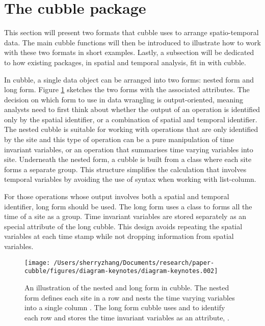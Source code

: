 \documentclass[
]{jss}
\begin{document}
\hypertarget{cubble}{%
\section{The cubble package}\label{cubble}}

This section will present two formats that cubble uses to arrange spatio-temporal data. The main cubble functions will then be introduced to illustrate how to work with these two formats in short examples. Lastly, a subsection will be dedicated to how existing packages, in spatial and temporal analysis, fit in with cubble.

In cubble, a single data object can be arranged into two forms: nested form and long form. Figure \ref{fig:illu-cubble} sketches the two forms with the associated attributes. The decision on which form to use in data wrangling is output-oriented, meaning analysts need to first think about whether the output of an operation is identified only by the spatial identifier, or a combination of spatial and temporal identifier. The nested cubble is suitable for working with operations that are only identified by the site and this type of operation can be a pure manipulation of time invariant variables, or an operation that summarises time varying variables into site. Underneath the nested form, a cubble is built from a  class where each site forms a separate group. This structure simplifies the calculation that involves temporal variables by avoiding the use of  syntax when working with list-column.

For those operations whose output involves both a spatial and temporal identifier, long form should be used. The long form uses a  class to forms all the time of a site as a group. Time invariant variables are stored separately as an special attribute of the long cubble. This design avoids repeating the spatial variables at each time stamp while not dropping information from spatial variables.

\begin{CodeChunk}
\begin{figure}

{\centering \texttt{[image: /Users/sherryzhang/Documents/research/paper-cubble/figures/diagram-keynotes/diagram-keynotes.002]} 

}

\caption{An illustration of the nested and long form in cubble. The nested form defines each site in a row and nests the time varying variables into a single column . The long form cubble uses  and  to identify each row and stores the time invariant variables as an attribute, .}\label{fig:illu-cubble}
\end{figure}
\end{CodeChunk}
\end{document}
